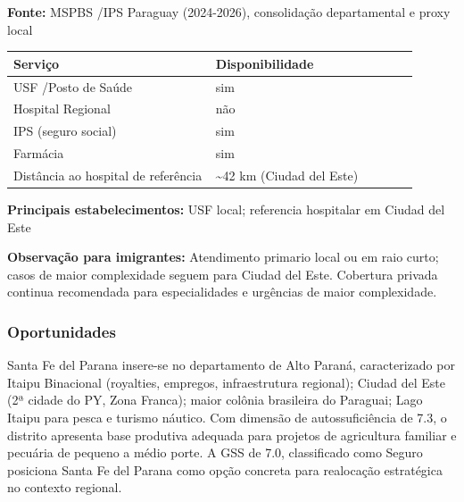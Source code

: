 \textbf{Fonte:} MSPBS /\allowbreak  IPS Paraguay (2024-2026), consolidação
departamental e proxy local

{\def\LTcaptype{none} %
\begin{longtable}{@{}>{\raggedright\arraybackslash}p{0.45\linewidth} >{\raggedright\arraybackslash}p{0.45\linewidth}@{}}
\toprule\noalign{}
Serviço & Disponibilidade \\
\midrule\noalign{}
\endhead
\bottomrule\noalign{}
\endlastfoot
USF /\allowbreak  Posto de Saúde & sim \\
Hospital Regional & não \\
IPS (seguro social) & sim \\
Farmácia & sim \\
Distância ao hospital de referência & \textasciitilde42 km (Ciudad del
Este) \\
\end{longtable}
}

\textbf{Principais estabelecimentos:} USF local; referencia hospitalar
em Ciudad del Este

\textbf{Observação para imigrantes:} Atendimento primario local ou em
raio curto; casos de maior complexidade seguem para Ciudad del Este.
Cobertura privada continua recomendada para especialidades e urgências
de maior complexidade.
\newpage

\subsubsection*{Oportunidades}\label{oport-santa-fe-del-parana-1020}
Santa Fe del Parana insere-se no departamento de Alto Paraná, caracterizado por Itaipu Binacional (royalties, empregos, infraestrutura regional); Ciudad del Este (2ª cidade do PY, Zona Franca); maior colônia brasileira do Paraguai; Lago Itaipu para pesca e turismo náutico. Com dimensão de autossuficiência de 7.3, o distrito apresenta base produtiva adequada para projetos de agricultura familiar e pecuária de pequeno a médio porte. A GSS de 7.0, classificado como Seguro posiciona Santa Fe del Parana como opção concreta para realocação estratégica no contexto regional.

